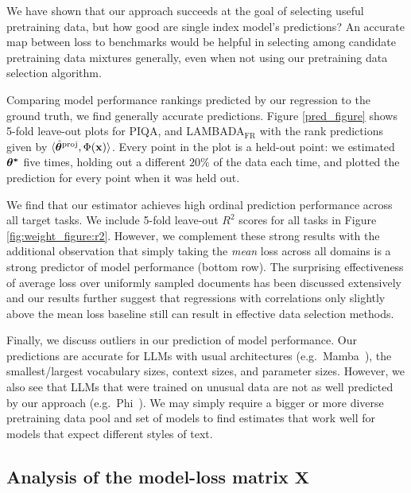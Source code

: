 \documentclass{article} %
\newcommand{\bmthproj}{\hat{\bm{\theta}}^{\textnormal{proj}}}
\begin{document}
We have shown that our approach succeeds at the goal of selecting useful pretraining data, but how good are single index model's predictions? An accurate map between loss to benchmarks would be helpful in selecting among candidate pretraining data mixtures generally, even when not using our pretraining data selection algorithm.

Comparing model performance rankings predicted by our regression to the ground truth, we find generally accurate predictions. Figure \ref{pred_figure} shows 5-fold leave-out plots for PIQA, and LAMBADA$_{\text{FR}}$ with the rank predictions given by $\langle\bmthproj,\Phi(\mathbf{x})\rangle$. Every point in the plot is a held-out point: we estimated $\bm{{\bf{\theta}^*}}$ five times, holding out a different $20\%$ of the data each time, and plotted the prediction for every point when it was held out. 

We find that our estimator achieves high ordinal prediction performance across all target tasks. We include 5-fold leave-out $R^2$ scores for all tasks in Figure \ref{fig:weight_figure:r2}. However, we complement these strong results with the additional observation that simply taking the \emph{mean} loss across all domains is a strong predictor of model performance (bottom row). The surprising effectiveness of average loss over uniformly sampled documents has been discussed extensively~\citep{owen2024predictable,wei2022emergent,kaplan2020scaling} and our results further suggest that regressions with correlations only slightly above the mean loss baseline still can result in effective data selection methods.

Finally, we discuss outliers in our prediction of model performance. Our predictions are accurate for LLMs with usual architectures (e.g.\ Mamba~\citep{mamba}), the smallest/largest vocabulary sizes, context sizes, and parameter sizes. However, we also see that LLMs that were trained on unusual data are not as well predicted by our approach (e.g.\ Phi~\citep{phi}). We may simply require a bigger or more diverse pretraining data pool and set of models to find estimates that work well for models that expect different styles of text.

\subsection{Analysis of the model-loss matrix \texorpdfstring{$\mathbf{X}$}{}}
\end{document}

